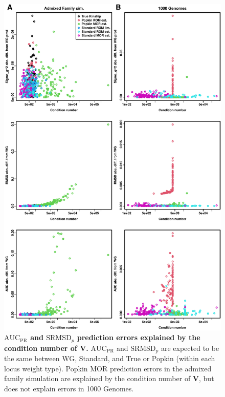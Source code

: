 \documentclass[11pt]{article}
\newcommand{\rmsd}{\text{SRMSD}_p}
\newcommand{\auc}{\text{AUC}_\text{PR}}
\begin{document}
\begin{figure}[bp!]
  \centering
  \includegraphics[height=0.9\textheight]{kappa-vs-pred-err.pdf}
  \caption{
    {\bf $\auc$ and $\rmsd$ prediction errors explained by the condition number of $\mathbf{V}$.}
    $\auc$ and $\rmsd$ are expected to be the same between WG, Standard, and True or Popkin (within each locus weight type).
    Popkin MOR prediction errors in the admixed family simulation are explained by the condition number of $\mathbf{V}$, but does not explain errors in 1000 Genomes.
  }
  \label{fig:kappa-vs-pred-err}
\end{figure}
\end{document}
